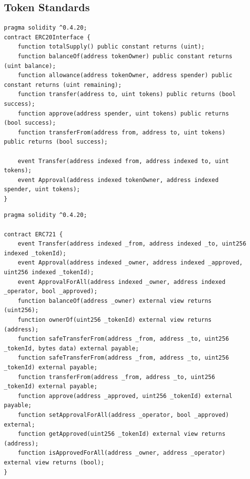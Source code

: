 \documentclass[12pt,tightenlines,letterpaper]{scrartcl}
\begin{document}
\newpage 
\begin{appendices}
\section{Token Standards}
%
\begin{lstlisting}[language=Solidity,caption=ERC20 Token Standard Interface]
pragma solidity ^0.4.20;
contract ERC20Interface {
    function totalSupply() public constant returns (uint);
    function balanceOf(address tokenOwner) public constant returns (uint balance);
    function allowance(address tokenOwner, address spender) public constant returns (uint remaining);
    function transfer(address to, uint tokens) public returns (bool success);
    function approve(address spender, uint tokens) public returns (bool success);
    function transferFrom(address from, address to, uint tokens) public returns (bool success);

    event Transfer(address indexed from, address indexed to, uint tokens);
    event Approval(address indexed tokenOwner, address indexed spender, uint tokens);
}
\end{lstlisting}

\begin{lstlisting}[language=Solidity, caption=ERC721 Token Standard Interface]
pragma solidity ^0.4.20;

contract ERC721 {
    event Transfer(address indexed _from, address indexed _to, uint256 indexed _tokenId);
    event Approval(address indexed _owner, address indexed _approved, uint256 indexed _tokenId);
    event ApprovalForAll(address indexed _owner, address indexed _operator, bool _approved);
    function balanceOf(address _owner) external view returns (uint256);
    function ownerOf(uint256 _tokenId) external view returns (address);
    function safeTransferFrom(address _from, address _to, uint256 _tokenId, bytes data) external payable;
    function safeTransferFrom(address _from, address _to, uint256 _tokenId) external payable;
    function transferFrom(address _from, address _to, uint256 _tokenId) external payable;
    function approve(address _approved, uint256 _tokenId) external payable;
    function setApprovalForAll(address _operator, bool _approved) external;
    function getApproved(uint256 _tokenId) external view returns (address);
    function isApprovedForAll(address _owner, address _operator) external view returns (bool);
}

\end{lstlisting}
\end{appendices}
\end{document}
